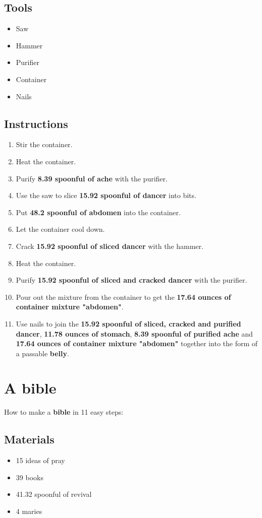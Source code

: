 \documentclass{article}
\begin{document}
\subsection{Tools}\begin{itemize}
\item 
Saw
\item 
Hammer
\item 
Purifier
\item 
Container
\item 
Nails
\end{itemize}
\subsection{Instructions}\begin{enumerate}
\item 
Stir the container.
\item 
Heat the container.
\item 
Purify \textbf{8.39 spoonful of ache} with the purifier.
\item 
Use the saw to slice \textbf{15.92 spoonful of dancer} into bits.
\item 
Put \textbf{48.2 spoonful of abdomen} into the container.
\item 
Let the container cool down.
\item 
Crack \textbf{15.92 spoonful of sliced dancer} with the hammer.
\item 
Heat the container.
\item 
Purify \textbf{15.92 spoonful of sliced and cracked dancer} with the purifier.
\item 
Pour out the mixture from the container to get the \textbf{17.64 ounces of container mixture "abdomen"}.
\item 
Use nails to join the \textbf{15.92 spoonful of sliced, cracked and purified dancer}, \textbf{11.78 ounces of stomach}, \textbf{8.39 spoonful of purified ache} and \textbf{17.64 ounces of container mixture "abdomen"} together into the form of a passable \textbf{belly}.
\end{enumerate}
\newpage
\section{A bible}How to make a \textbf{bible} in 11 easy steps:

\subsection{Materials}\begin{itemize}
\item 
15 ideas of pray
\item 
39 books
\item 
41.32 spoonful of revival
\item 
4 maries
\end{itemize}
\end{document}
